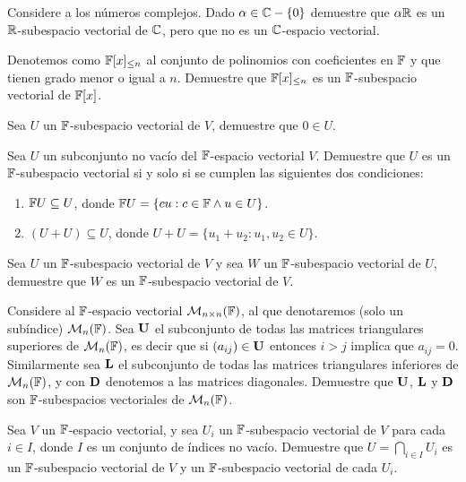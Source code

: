 \begin{exerciselist}
  \item Considere a los números complejos. Dado $\alpha \in \mathbb{C}-\{0\}$ demuestre que $\alpha \mathbb{R}$ es un $\mathbb{R}$-subespacio vectorial de $\mathbb{C}$, pero que no es un $\mathbb{C}$-espacio vectorial.
  
  \item \label{exer:PolyGradLeqn} Denotemos como $\mathbb{F}[x]_{\leq n}$ al conjunto de polinomios con coeficientes en $\mathbb{F}$ y que tienen grado menor o igual a $n$. Demuestre que $\mathbb{F}[x]_{\leq n}$ es un $\mathbb{F}$-subespacio vectorial de $\mathbb{F}[x]$.
  
  \item Sea $U$ un $\mathbb{F}$-subespacio vectorial de $V$, demuestre que $0 \in U$.
  
  \item Sea $U$ un subconjunto no vacío del $\mathbb{F}$-espacio vectorial $V$. Demuestre que $U$ es un $\mathbb{F}$-subespacio vectorial si y solo si se cumplen las siguientes dos condiciones:
    \begin{enumerate}
      \item $\mathbb{F} U \subseteq U$, donde $\mathbb{F} U = \{cu : c \in \mathbb{F} \land u \in U\}$.
      \item $(U + U) \subseteq U$, donde $U+U = \{u_1 + u_2 \colon u_1, u_2 \in U\}$.
    \end{enumerate}

  \item Sea $U$ un $\mathbb{F}$-subespacio vectorial de $V$ y sea $W$ un $\mathbb{F}$-subespacio vectorial de $U$, demuestre que $W$ es un $\mathbb{F}$-subespacio vectorial de $V$.
  
  \item \label{exer:MatULD} Considere al $\mathbb{F}$-espacio vectorial $\mathcal{M}_{n\times n} ( \mathbb{F} )$, al que denotaremos (solo un subíndice) $\mathcal{M}_n(\mathbb{F})$. Sea $\mathbf{U}$ el subconjunto de todas las matrices triangulares superiores de $\mathcal{M}_n(\mathbb{F})$, es decir que si $(a_{ij}) \in \mathbf{U}$ entonces $i > j$ implica que $a_{ij} = 0$. Similarmente sea $\mathbf{L}$ el subconjunto de todas las matrices triangulares inferiores de $\mathcal{M}_n(\mathbb{F})$, y con $\mathbf{D}$ denotemos a las matrices diagonales. Demuestre que $\mathbf{U}$, $\mathbf{L}$ y $\mathbf{D}$ son $\mathbb{F}$-subespacios vectoriales de $\mathcal{M}_n(\mathbb{F})$.
  
  \item Sea $V$ un $\mathbb{F}$-espacio vectorial, y sea $U_i$ un $\mathbb{F}$-subespacio vectorial de $V$ para cada $i \in I$, donde $I$ es un conjunto de índices no vacío. Demuestre que $U = \bigcap_{i \in I} U_i$ es un $\mathbb{F}$-subespacio vectorial de $V$ y un $\mathbb{F}$-subespacio vectorial de cada $U_i$.
  

\end{exerciselist}
